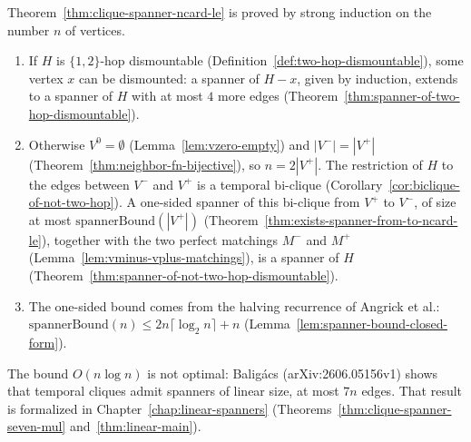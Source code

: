 Theorem~\ref{thm:clique-spanner-ncard-le} is proved by strong induction on the
number $n$ of vertices.
\begin{enumerate}
\item
  If $H$ is $\{1,2\}$-hop dismountable (Definition~\ref{def:two-hop-dismountable}),
  some vertex $x$ can be dismounted: a spanner of $H - x$, given by induction,
  extends to a spanner of $H$ with at most $4$ more edges
  (Theorem~\ref{thm:spanner-of-two-hop-dismountable}).
\item
  Otherwise $V^0 = \emptyset$ (Lemma~\ref{lem:vzero-empty}) and
  $|V^-| = |V^+|$ (Theorem~\ref{thm:neighbor-fn-bijective}), so $n = 2|V^+|$.
  The restriction of $H$ to the edges between $V^-$ and $V^+$ is a temporal
  bi-clique (Corollary~\ref{cor:biclique-of-not-two-hop}). A one-sided spanner
  of this bi-clique from $V^+$ to $V^-$, of size at most
  $\mathrm{spannerBound}(|V^+|)$
  (Theorem~\ref{thm:exists-spanner-from-to-ncard-le}), together with the two
  perfect matchings $M^-$ and $M^+$ (Lemma~\ref{lem:vminus-vplus-matchings}),
  is a spanner of $H$ (Theorem~\ref{thm:spanner-of-not-two-hop-dismountable}).
\item
  The one-sided bound comes from the halving recurrence of Angrick et al.:
  $\mathrm{spannerBound}(n) \le 2n\lceil\log_2 n\rceil + n$
  (Lemma~\ref{lem:spanner-bound-closed-form}).
\end{enumerate}

The bound $O(n \log n)$ is not optimal: Baligács (arXiv:2606.05156v1) shows
that temporal cliques admit spanners of linear size, at most $7n$ edges. That
result is formalized in Chapter~\ref{chap:linear-spanners}
(Theorems~\ref{thm:clique-spanner-seven-mul} and~\ref{thm:linear-main}).
